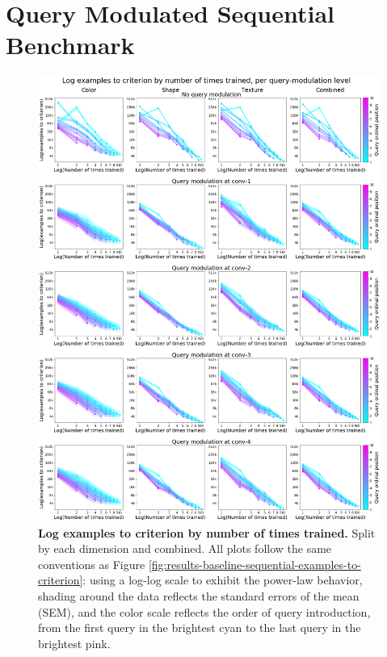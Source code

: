 \FloatBarrier
\section{Query Modulated Sequential Benchmark \label{sec:additional-figures-query-mod-sequential}}

\begin{figure}[!htb]
\centering
\includegraphics[width=\linewidth]{ch-results/figures/query_mod_benchmark/examples_to_criterion_per_modualtion_level_times_trained.png}
\caption{ {\bf Log examples to criterion by number of times trained.} Split by each dimension and combined. All plots follow the same conventions as Figure \ref{fig:results-baseline-sequential-examples-to-criterion}: using a log-log scale to exhibit the power-law behavior, shading around the data reflects the standard errors of the mean (SEM), and the color scale reflects the order of query introduction, from the first query in the brightest cyan to the last query in the brightest pink.}
\label{fig:results-query-mod-benchmark-examples-to-criterion-per-modualtion-level-times-trained}
\end{figure}

